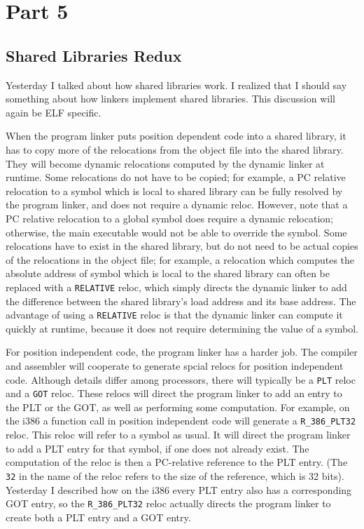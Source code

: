 \section{Part 5}
\subsection{Shared Libraries Redux}

Yesterday I talked about how shared libraries work.  I realized that I should
say something about how linkers implement shared libraries.  This discussion
will again be ELF specific.

When the program linker puts position dependent code into a shared library, it
has to copy more of the relocations from the object file into the shared
library.  They will become dynamic relocations computed by the dynamic linker
at runtime.  Some relocations do not have to be copied; for example, a PC
relative relocation to a symbol which is local to shared library can be fully
resolved by the program linker, and does not require a dynamic reloc.  However,
note that a PC relative relocation to a global symbol does require a dynamic
relocation; otherwise, the main executable would not be able to override the
symbol.  Some relocations have to exist in the shared library, but do not need
to be actual copies of the relocations in the object file; for example, a
relocation which computes the absolute address of symbol which is local to the
shared library can often be replaced with a \texttt{RELATIVE} reloc, which simply
directs the dynamic linker to add the difference between the shared library's
load address and its base address.  The advantage of using a \texttt{RELATIVE}
reloc is that the dynamic linker can compute it quickly at runtime, because it
does not require determining the value of a symbol.

For position independent code, the program linker has a harder job.  The
compiler and assembler will cooperate to generate spcial relocs for position
independent code.  Although details differ among processors, there will
typically be a \texttt{PLT} reloc and a \texttt{GOT} reloc.  These relocs will
direct the program linker to add an entry to the PLT or the GOT, as well as
performing some computation.  For example, on the i386 a function call in
position independent code will generate a \texttt{R\_386\_PLT32} reloc.  This reloc
will refer to a symbol as usual.  It will direct the program linker to add a
PLT entry for that symbol, if one does not already exist.  The computation of
the reloc is then a PC-relative reference to the PLT entry.  (The \texttt{32} in
the name of the reloc refers to the size of the reference, which is 32 bits).
Yesterday I described how on the i386 every PLT entry also has a corresponding
GOT entry, so the \texttt{R\_386\_PLT32} reloc actually directs the program linker
to create both a PLT entry and a GOT entry.

